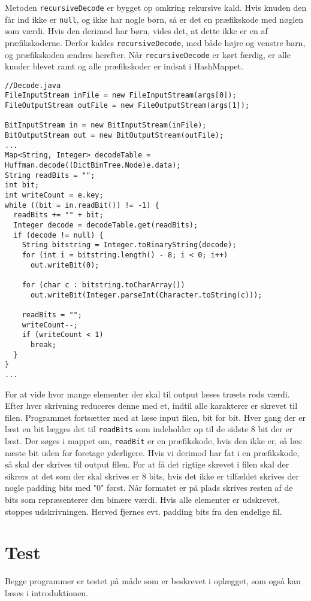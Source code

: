 \documentclass{article}
\begin{document}
Metoden \texttt{recursiveDecode} er bygget op omkring rekursive kald. Hvis knuden den får ind ikke er \texttt{null}, og ikke har nogle børn, så er det en præfikskode med nøglen som værdi. Hvis den derimod har børn, vides det, at dette ikke er en af præfikskoderne. Derfor kaldes \texttt{recursiveDecode}, med både højre og venstre barn, og præfikskoden ændres herefter.
Når \texttt{recursiveDecode} er kørt færdig, er alle knuder blevet ramt og alle præfikskoder er indsat i HashMappet.
\begin{lstlisting}
//Decode.java
FileInputStream inFile = new FileInputStream(args[0]);
FileOutputStream outFile = new FileOutputStream(args[1]);

BitInputStream in = new BitInputStream(inFile);
BitOutputStream out = new BitOutputStream(outFile);
...
Map<String, Integer> decodeTable = Huffman.decode((DictBinTree.Node)e.data);
String readBits = "";
int bit;
int writeCount = e.key;
while ((bit = in.readBit()) != -1) {
  readBits += "" + bit;
  Integer decode = decodeTable.get(readBits);
  if (decode != null) {
    String bitstring = Integer.toBinaryString(decode);
    for (int i = bitstring.length() - 8; i < 0; i++) 
      out.writeBit(0);	

    for (char c : bitstring.toCharArray())
      out.writeBit(Integer.parseInt(Character.toString(c)));

    readBits = "";
    writeCount--;
    if (writeCount < 1) 
      break;
  }
}
...
\end{lstlisting}
For at vide hvor mange elementer der skal til output læses træets rods værdi. Efter hver skrivning reduceres denne med et, indtil alle karakterer er skrevet til filen.
Programmet fortsætter med at læse input filen, bit for bit. Hver gang der er læst en bit lægges det til \texttt{readBits} som indeholder op til de sidste 8 bit der er læst.
Der søges i mappet om, \texttt{readBit} er en præfikskode, hvis den ikke er, så læs næste bit uden for foretage yderligere. Hvis vi derimod har fat i en præfikskode, så skal der skrives til output filen.
For at få det rigtige skrevet i filen skal der sikrers at det som der skal skrives er 8 bits, hvis det ikke er tilfældet skrives der nogle padding bits med "0" først. Når formatet er på plads skrives resten af de bits som repræsenterer den binære værdi. Hvis alle elementer er udskrevet, stoppes udskrivningen. Herved fjernes evt. padding bits fra den endelige fil.
\newpage
\section*{Test}
Begge programmer er testet på måde som er beskrevet i oplægget, som også kan læses i introduktionen.
\end{document}
